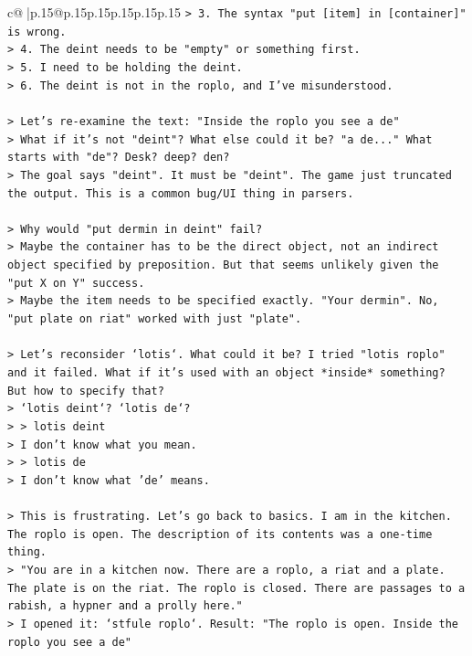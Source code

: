 \documentclass{article}
\begin{document}
{\begin{supertabular}{c@{$\;$}|p{.15\linewidth}@{}p{.15\linewidth}p{.15\linewidth}p{.15\linewidth}p{.15\linewidth}p{.15\linewidth}}
{{{\texttt{> 3. The syntax "put {[}item{]} in {[}container{]}" is wrong.} \\
\texttt{> 4. The deint needs to be "empty" or something first.} \\
\texttt{> 5. I need to be holding the deint.} \\
\texttt{> 6. The deint is not in the roplo, and I've misunderstood.} \\
\\ 
\texttt{> Let's re{-}examine the text: "Inside the roplo you see a de"} \\
\texttt{> What if it's not "deint"? What else could it be? "a de..." What starts with "de"? Desk? deep? den?} \\
\texttt{> The goal says "deint". It must be "deint". The game just truncated the output. This is a common bug/UI thing in parsers.} \\
\\ 
\texttt{> Why would "put dermin in deint" fail?} \\
\texttt{> Maybe the container has to be the direct object, not an indirect object specified by preposition. But that seems unlikely given the "put X on Y" success.} \\
\texttt{> Maybe the item needs to be specified exactly. "Your dermin". No, "put plate on riat" worked with just "plate".} \\
\\ 
\texttt{> Let's reconsider `lotis`. What could it be? I tried "lotis roplo" and it failed. What if it's used with an object *inside* something? But how to specify that?} \\
\texttt{> `lotis deint`? `lotis de`?} \\
\texttt{> > lotis deint} \\
\texttt{> I don't know what you mean.} \\
\texttt{> > lotis de} \\
\texttt{> I don't know what 'de' means.} \\
\\ 
\texttt{> This is frustrating. Let's go back to basics. I am in the kitchen. The roplo is open. The description of its contents was a one{-}time thing.} \\
\texttt{> "You are in a kitchen now. There are a roplo, a riat and a plate. The plate is on the riat. The roplo is closed. There are passages to a rabish, a hypner and a prolly here."} \\
\texttt{> I opened it: `stfule roplo`. Result: "The roplo is open. Inside the roplo you see a de"} \\
}}}
\end{supertabular}}
\end{document}
